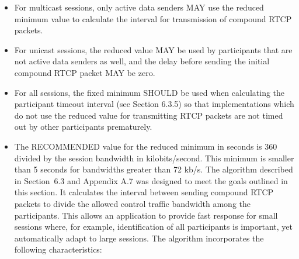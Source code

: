 \documentclass{article}
\begin{document}
\begin{itemize}
\item For multicast sessions, only active data senders MAY use the reduced minimum value to calculate the interval for transmission of compound RTCP packets.
\item For unicast sessions, the reduced value MAY be used by participants that are not active data senders as well, and the delay before sending the initial compound RTCP packet MAY be zero.
\item For all sessions, the fixed minimum SHOULD be used when calculating the participant timeout interval (see Section 6.3.5) so that implementations which do not use the reduced value for transmitting RTCP packets are not timed out by other participants prematurely.
\item The RECOMMENDED value for the reduced minimum in seconds is 360 divided by the session bandwidth in kilobits/second.  This minimum is smaller than 5 seconds for bandwidths greater than 72 kb/s.
The algorithm described in Section~6.3 and Appendix A.7 was designed to meet the goals outlined in this section.  It calculates the interval between sending compound RTCP packets to divide the allowed control traffic bandwidth among the participants.  This allows an application to provide fast response for small sessions where, for example, identification of all participants is important, yet automatically adapt to large sessions.  The algorithm incorporates the following characteristics:


\end{itemize}
\end{document}
